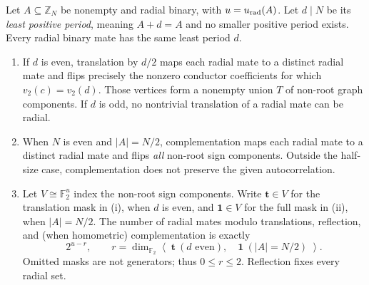 \begin{proposition}\label{ii:prop:symmetries}
Let $A\subseteq\mathbb Z_N$ be nonempty and radial binary, with $u=u_{\rm rad}(A)$.  Let $d\mid N$ be its \emph{least positive period}, meaning $A+d=A$ and no smaller positive period exists.  Every radial binary mate has the same least period $d$.

\begin{enumerate}[label=(\roman*),nosep]
\item If $d$ is even, translation by $d/2$ maps each radial mate to a distinct radial mate and flips precisely the nonzero conductor coefficients for which $v_2(c)=v_2(d)$.  Those vertices form a nonempty union $T$ of non-root graph components.  If $d$ is odd, no nontrivial translation of a radial mate can be radial.
\item When $N$ is even and $|A|=N/2$, complementation maps each radial mate to a distinct radial mate and flips \emph{all} non-root sign components.  Outside the half-size case, complementation does not preserve the given autocorrelation.
\item Let $V\cong\mathbb F_2^u$ index the non-root sign components.  Write $\mathbf t\in V$ for the translation mask in (i), when $d$ is even, and $\mathbf1\in V$ for the full mask in (ii), when $|A|=N/2$.  The number of radial mates modulo translations, reflection, and (when homometric) complementation is exactly
\begin{equation}\label{ii:eq:orbitcount}
 2^{u-r},\qquad r=\dim_{\mathbb F_2}\left\langle\;\mathbf t\ (d\text{ even}),\quad\mathbf1\ (|A|=N/2)\;\right\rangle.
\end{equation}
Omitted masks are not generators; thus $0\le r\le2$.  Reflection fixes every radial set.
\end{enumerate}
\end{proposition}
